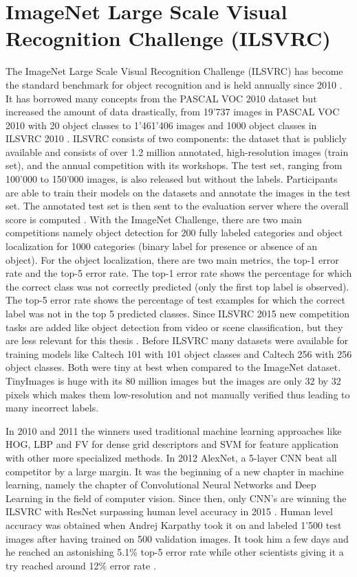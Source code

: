 \section{ImageNet Large Scale Visual Recognition Challenge (ILSVRC)}

The ImageNet Large Scale Visual Recognition Challenge (ILSVRC) has become the standard benchmark for object recognition and is held annually since 2010 \cite{imagenet}. It has borrowed many concepts from the PASCAL VOC 2010 dataset but increased the amount of data drastically, from 19'737 images in PASCAL VOC 2010 with 20 object classes to 1'461'406 images and 1000 object classes in ILSVRC 2010 \cite{everingham2010pascal, russakovsky2015imagenet}. ILSVRC consists of two components: the dataset that is publicly available and consists of over 1.2 million annotated, high-resolution images (train set), and the annual competition with its workshops. The test set, ranging from 100'000 to 150'000 images, is also released but without the labels. Participants are able to train their models on the datasets and annotate the images in the test set. The annotated test set is then sent to the evaluation server where the overall score is computed \cite{russakovsky2015imagenet}. With the ImageNet Challenge, there are two main competitions namely object detection for 200 fully labeled categories and object localization for 1000 categories (binary label for presence or absence of an object). For the object localization, there are two main metrics, the top-1 error rate and the top-5 error rate. The top-1 error rate shows the percentage for which the correct class was not correctly predicted (only the first top label is observed). The top-5 error rate shows the percentage of test examples for which the correct label was not in the top 5 predicted classes. Since ILSVRC 2015 new competition tasks are added like object detection from video or scene classification, but they are less relevant for this thesis \cite{imagenet2015}. Before ILSVRC many datasets were available for training models like Caltech 101 \cite{fei2007learning} with 101 object classes and Caltech 256 \cite{griffin2007caltech} with 256 object classes. Both were tiny at best when compared to the ImageNet dataset. TinyImages \cite{torralba200880} is huge with its 80 million images but the images are only 32 by 32 pixels which makes them low-resolution and not manually verified thus leading to many incorrect labels.

In 2010 and 2011 the winners used traditional machine learning approaches like HOG, LBP and FV for dense grid descriptors and SVM for feature application with other more specialized methods. In 2012 AlexNet, a 5-layer CNN beat all competitor by a large margin. It was the beginning of a new chapter in machine learning, namely the chapter of Convolutional Neural Networks and Deep Learning in the field of computer vision. Since then, only CNN's are winning the ILSVRC with ResNet surpassing human level accuracy in 2015 \cite{he2016deep}. Human level accuracy was obtained when Andrej Karpathy took it on and labeled 1'500 test images after having trained on 500 validation images. It took him a few days and he reached an astonishing 5.1\% top-5 error rate while other scientists giving it a try reached around 12\% error rate \cite{humanlevel2014}.

